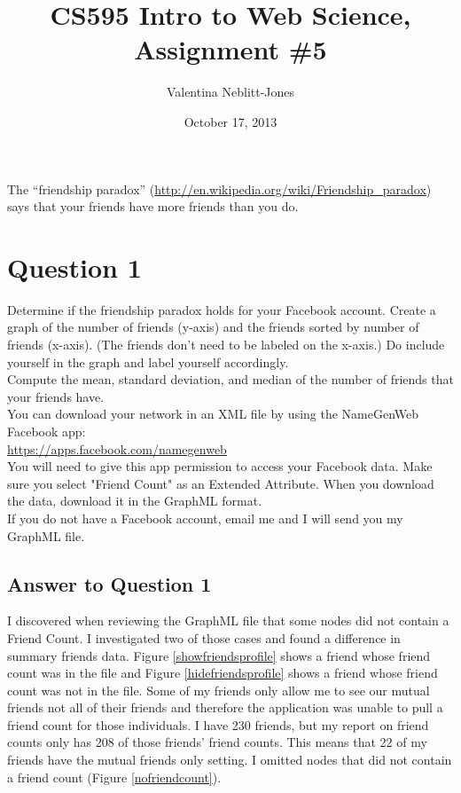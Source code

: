 \documentclass{article}
\begin{document}
\title{CS595 Intro to Web Science, Assignment \#5}
\author{Valentina Neblitt-Jones}
\date{October 17, 2013}
\maketitle

The ``friendship paradox'' (\url{http://en.wikipedia.org/wiki/Friendship_paradox})  says that your friends have more friends than you do. \\

\section*{Question 1}

Determine if the friendship paradox holds for your Facebook account. Create a graph of the number of friends (y-axis) and the friends sorted by number of friends (x-axis). (The friends don't need to be labeled on the x-axis.) Do include yourself in the graph and label yourself accordingly. \\

Compute the mean, standard deviation, and median of the number of friends that your friends have. \\

You can download your network in an XML file by using the NameGenWeb Facebook app:  \\

\url{https://apps.facebook.com/namegenweb} \\

You will need to give this app permission to access your Facebook data. Make sure you select "Friend Count" as an Extended Attribute. When you download the data, download it in the GraphML format. \\

If you do not have a Facebook account, email me and I will send you my GraphML file.

\subsection*{Answer to Question 1}

I discovered when reviewing the GraphML file that some nodes did not contain a Friend Count. I investigated two of those cases and found a difference in summary friends data. Figure \ref{showfriendsprofile} shows a friend whose friend count was in the file and Figure \ref{hidefriendsprofile} shows a friend whose friend count was not in the file. Some of my friends only allow me to see our mutual friends not all of their friends and therefore the application was unable to pull a friend count for those individuals. I have 230 friends, but my report on friend counts only has 208 of those friends' friend counts. This means that 22 of my friends have the mutual friends only setting. I omitted nodes that did not contain a friend count (Figure \ref{nofriendcount}).
\end{document}
